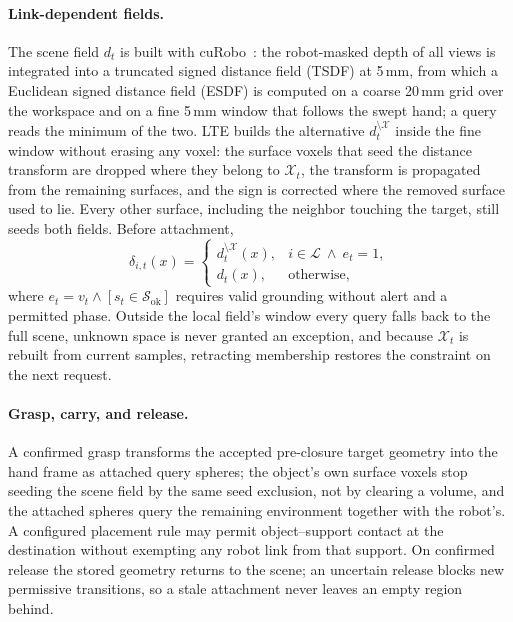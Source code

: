 \paragraph{Link-dependent fields.}
The scene field $d_t$ is built with cuRobo~\cite{sundaralingam2026curobov2}: the robot-masked depth of all views is integrated into a truncated signed distance field (TSDF) at 5\,mm, from which a Euclidean signed distance field (ESDF) is computed on a coarse 20\,mm grid over the workspace and on a fine 5\,mm window that follows the swept hand; a query reads the minimum of the two. LTE builds the alternative $d_t^{\setminus\mathcal X}$ inside the fine window without erasing any voxel: the surface voxels that seed the distance transform are dropped where they belong to $\mathcal X_t$, the transform is propagated from the remaining surfaces, and the sign is corrected where the removed surface used to lie. Every other surface, including the neighbor touching the target, still seeds both fields. Before attachment,
\begin{equation}
 \delta_{i,t}(x)=
 \begin{cases}
 d_t^{\setminus\mathcal X}(x), & i\in\mathcal L\ \land\ e_t=1,\\
 d_t(x), & \text{otherwise},
 \end{cases}
 \label{eq:linkquery}
\end{equation}
where $e_t=v_t\land[s_t\in\mathcal S_{\mathrm{ok}}]$ requires valid grounding without alert and a permitted phase. Outside the local field's window every query falls back to the full scene, unknown space is never granted an exception, and because $\mathcal X_t$ is rebuilt from current samples, retracting membership restores the constraint on the next request.

\paragraph{Grasp, carry, and release.}
A confirmed grasp transforms the accepted pre-closure target geometry into the hand frame as attached query spheres; the object's own surface voxels stop seeding the scene field by the same seed exclusion, not by clearing a volume, and the attached spheres query the remaining environment together with the robot's. A configured placement rule may permit object--support contact at the destination without exempting any robot link from that support. On confirmed release the stored geometry returns to the scene; an uncertain release blocks new permissive transitions, so a stale attachment never leaves an empty region behind.

